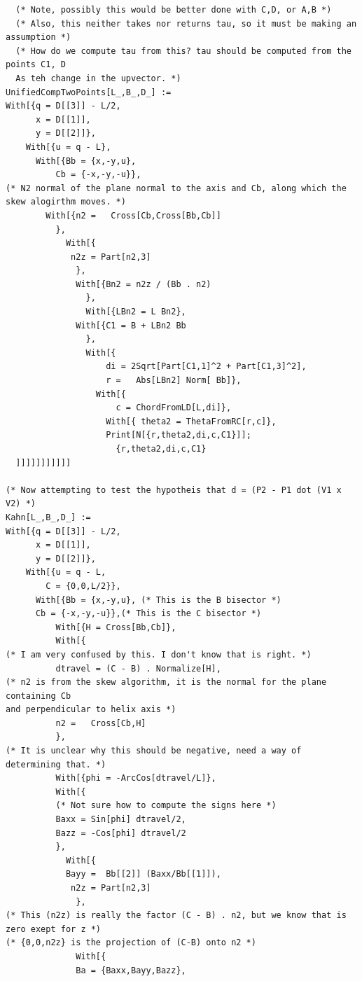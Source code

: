 \documentclass[11pt]{article}
\begin{document}
{\begin{verbatim}
  (* Note, possibly this would be better done with C,D, or A,B *)
  (* Also, this neither takes nor returns tau, so it must be making an assumption *)
  (* How do we compute tau from this? tau should be computed from the points C1, D
  As teh change in the upvector. *)
UnifiedCompTwoPoints[L_,B_,D_] :=
With[{q = D[[3]] - L/2,
      x = D[[1]],
      y = D[[2]]},
    With[{u = q - L},
      With[{Bb = {x,-y,u},
          Cb = {-x,-y,-u}},
(* N2 normal of the plane normal to the axis and Cb, along which the skew alogirthm moves. *)
        With[{n2 =   Cross[Cb,Cross[Bb,Cb]]
          },
            With[{
             n2z = Part[n2,3]
              },
              With[{Bn2 = n2z / (Bb . n2)
                },
                With[{LBn2 = L Bn2},
              With[{C1 = B + LBn2 Bb
                },
                With[{
                    di = 2Sqrt[Part[C1,1]^2 + Part[C1,3]^2],
                    r =   Abs[LBn2] Norm[ Bb]},
                  With[{
                      c = ChordFromLD[L,di]},
                    With[{ theta2 = ThetaFromRC[r,c]},
                    Print[N[{r,theta2,di,c,C1}]];
                      {r,theta2,di,c,C1}
  ]]]]]]]]]]]

(* Now attempting to test the hypotheis that d = (P2 - P1 dot (V1 x V2) *)
Kahn[L_,B_,D_] :=
With[{q = D[[3]] - L/2,
      x = D[[1]],
      y = D[[2]]},
    With[{u = q - L,
        C = {0,0,L/2}},
      With[{Bb = {x,-y,u}, (* This is the B bisector *)
      Cb = {-x,-y,-u}},(* This is the C bisector *)
          With[{H = Cross[Bb,Cb]},
          With[{      
(* I am very confused by this. I don't know that is right. *)
          dtravel = (C - B) . Normalize[H],
(* n2 is from the skew algorithm, it is the normal for the plane containing Cb 
and perpendicular to helix axis *)
          n2 =   Cross[Cb,H]
          },
(* It is unclear why this should be negative, need a way of determining that. *)
          With[{phi = -ArcCos[dtravel/L]},
          With[{
          (* Not sure how to compute the signs here *)
          Baxx = Sin[phi] dtravel/2,
          Bazz = -Cos[phi] dtravel/2
          },
            With[{
            Bayy =  Bb[[2]] (Baxx/Bb[[1]]),  
             n2z = Part[n2,3]
              },
(* This (n2z) is really the factor (C - B) . n2, but we know that is zero exept for z *)
(* {0,0,n2z} is the projection of (C-B) onto n2 *)
              With[{
              Ba = {Baxx,Bayy,Bazz},


\end{verbatim}}
\end{document}
